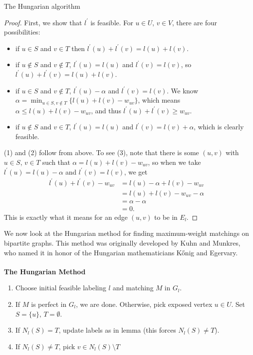 \documentclass[11pt]{article}
\renewcommand{\'}{^{'}}
\begin{document}
\begin{section}{The Hungarian algorithm}
	\begin{proof}
		First, we show that $l\'$ is feasible. For $u\in U$, $v\in V$, there are four 
		possibilities:
		\begin{itemize}
			\item if $u\in S$ and $v\in T$ then $l\' (u) + l\' (v) = l(u) + l(v)$.
			\item if $u\notin S$ and $v\notin T$, $l\' (u) = l(u)$ and $l\' (v) = l(v)$, 
				so $l\' (u) + l\' (v) = l(u) + l(v)$.
			\item if $u\in S$ and $v\notin T$, $l\' (u) - \alpha$ and $l\' (v) = l(v)$. 
				We know $\alpha = \min_{u\in S,v\notin T} \{l(u) + l(v) - w_{uv}\}$, 
				which means $\alpha \leq l(u) + l(v) - w_{uv}$, and thus 
				$l\' (u) + l\' (v) \geq w_{uv}$.
			\item if $u\notin S$ and $v\in T$, $l\' (u) = l(u)$ and $l\' (v) = l(v) + 
				\alpha$, which is clearly feasible.
		\end{itemize}
		(1) and (2) follow from above. To see (3), note that there is some $(u,v)$ with 
		$u\in S$, $v\in T$ such that $\alpha = l(u) + l(v) - w_{uv}$, so when we take 
		$l\' (u) = l(u) - \alpha$ and $l\' (v) = l(v)$, we get 
		\begin{align*}
			l\' (u) + l\' (v) - w_{uv} &= l(u) - \alpha + l(v) - w_{uv} \\
						   &= l(u) + l(v) - w_{uv} - \alpha \\
						   &= \alpha - \alpha \\
						   &= 0.
		\end{align*}
		This is exactly what it means for an edge $(u,v)$ to be in $E_l$.
	\end{proof}
	We now look at the Hungarian method for finding maximum-weight matchings on bipartite graphs. 
	This method was originally developed by Kuhn and Munkres, who named it in honor of the Hungarian 
	mathematicians K\H{o}nig and Egervary.\\
	\\
	\textbf{The Hungarian Method}
	\begin{enumerate}
		\item Choose initial feasible labeling $l$ and matching $M$ in $G_l$.
		\item If $M$ is perfect in $G_l$, we are done. Otherwise, pick exposed 
			vertex $u\in U$. Set $S = \{u\}$, $T=\emptyset$.
		\item If $N_l (S) = T$, update labels as in lemma (this forces $N_l (S)\neq T$).
		\item If $N_l (S) \neq T$, pick $v\in N_l (S)\setminus T$

\end{enumerate}
\end{section}
\end{document}
